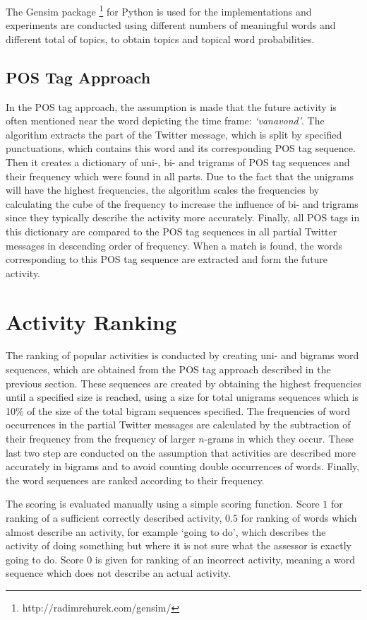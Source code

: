 The Gensim package \footnote{http://radimrehurek.com/gensim/} for Python is used for the implementations and experiments are conducted using different numbers of meaningful words and different total of topics, to obtain topics and topical word probabilities. 

\subsection{POS Tag Approach}
In the POS tag approach, the assumption is made that the future activity is often mentioned near the word depicting the time frame: \textit{`vanavond'}. The algorithm extracts the part of the Twitter message, which is split by specified punctuations, which contains this word and its corresponding POS tag sequence. Then it creates a dictionary of uni-, bi- and trigrams of POS tag sequences and their frequency which were found in all parts. Due to the fact that the unigrams will have the highest frequencies, the algorithm scales the frequencies by calculating the cube of the frequency to increase the influence of bi- and trigrams since they typically describe the activity more accurately. Finally, all POS tags in this dictionary are compared to the POS tag sequences in all partial Twitter messages in descending order of frequency. When a match is found, the words corresponding to this POS tag sequence are extracted and form the future activity.

\section{Activity Ranking}\label{sec:ranking}
The ranking of popular activities is conducted by creating uni- and bigrams word sequences, which are obtained from the POS tag approach described in the previous section. These sequences are created by obtaining the highest frequencies until a specified size is reached, using a size for total unigrams sequences which is 10\% of the size of the total bigram sequences specified. The frequencies of word occurrences in the partial Twitter messages are calculated by the subtraction of their frequency from the frequency of larger $n$-grams in which they occur. These last two step are conducted on the assumption that activities are described more accurately in bigrams and to avoid counting double occurrences of words. Finally, the word sequences are ranked according to their frequency.

The scoring is evaluated manually using a simple scoring function. Score $1$ for ranking of a sufficient correctly described activity, $0.5$ for ranking of words which almost describe an activity, for example `going to do', which describes the activity of doing something but where it is not sure what the assessor is exactly going to do. Score $0$ is given for ranking of an incorrect activity, meaning a word sequence which does not describe an actual activity.
